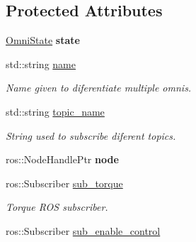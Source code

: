\subsection*{Protected Attributes}
\begin{DoxyCompactItemize}
\item 
\hypertarget{classOmniBase_acfbd44decc32ec4af3eeca3e25281e45}{\hyperlink{structOmniBase_1_1OmniState}{Omni\-State} {\bfseries state}}\label{classOmniBase_acfbd44decc32ec4af3eeca3e25281e45}

\item 
\hypertarget{classOmniBase_a69efd9c11cdef64cbdcf57b52c6539f7}{std\-::string \hyperlink{classOmniBase_a69efd9c11cdef64cbdcf57b52c6539f7}{name}}\label{classOmniBase_a69efd9c11cdef64cbdcf57b52c6539f7}

\begin{DoxyCompactList}\small\item\em Name given to diferentiate multiple omnis. \end{DoxyCompactList}\item 
\hypertarget{classOmniBase_aad7cbf8f7beffd367ab50c3453e8d459}{std\-::string \hyperlink{classOmniBase_aad7cbf8f7beffd367ab50c3453e8d459}{topic\-\_\-name}}\label{classOmniBase_aad7cbf8f7beffd367ab50c3453e8d459}

\begin{DoxyCompactList}\small\item\em String used to subscribe diferent topics. \end{DoxyCompactList}\item 
\hypertarget{classOmniBase_a6bd8b4515724498791325d07caa849de}{ros\-::\-Node\-Handle\-Ptr {\bfseries node}}\label{classOmniBase_a6bd8b4515724498791325d07caa849de}

\item 
\hypertarget{classOmniBase_aca7da5f50524b6ad3d08deb11be59e2d}{ros\-::\-Subscriber \hyperlink{classOmniBase_aca7da5f50524b6ad3d08deb11be59e2d}{sub\-\_\-torque}}\label{classOmniBase_aca7da5f50524b6ad3d08deb11be59e2d}

\begin{DoxyCompactList}\small\item\em Torque R\-O\-S subscriber. \end{DoxyCompactList}\item 
\hypertarget{classOmniBase_a19970fdd4e693296f33fea90e8080033}{ros\-::\-Subscriber \hyperlink{classOmniBase_a19970fdd4e693296f33fea90e8080033}{sub\-\_\-enable\-\_\-control}}\label{classOmniBase_a19970fdd4e693296f33fea90e8080033}


\end{DoxyCompactItemize}
